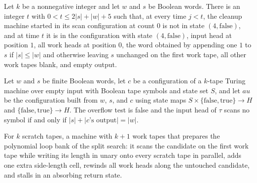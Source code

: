 \begin{lemma}
\label{Turing.FinTM.splitRestore_first}
\leanok
{}
Let $k$ be a nonnegative integer and let $w$ and $s$ be Boolean words. There is an
integer $t$ with $0<t\le 2|s|+|w|+5$ such that, at every time $j<t$, the cleanup machine
started in its scan configuration at count $0$ is not in state $(4,\mathrm{false})$, and
at time $t$ it is in the configuration with state $(4,\mathrm{false})$, input head at
position $1$, all work heads at position $0$, the word obtained by appending one $1$ to
$s$ if $|s|\le |w|$ and otherwise leaving $s$ unchanged on the first work tape, all
other work tapes blank, and empty output.
\end{lemma}

\begin{lemma}
\label{Turing.FinTM.splitCount_accept}
\leanok
{}
Let $w$ and $s$ be finite Boolean words, let $c$ be a configuration of a $k$-tape Turing
machine over empty input with Boolean tape symbols and state set $S$, and let $	au$ be
the configuration built from $w$, $s$, and $c$ using state maps
$S\times\{\mathrm{false},\mathrm{true}\}\to H$ and $\{\mathrm{false},\mathrm{true}\}\to
H$. The overflow test is false and the input head of $\tau$ scans no symbol if and only
if $|s|+|c\text{'s output}|=|w|$.
\end{lemma}

\begin{definition}
\label{Turing.FinTM.splitPrepareTM}
\leanok
{}
For $k$ scratch tapes, a machine with $k+1$ work tapes that prepares the
polynomial loop bank of the split search: it scans the candidate on the first
work tape while writing its length in unary onto every scratch tape in
parallel, adds one extra side-length cell, rewinds all work heads along the
untouched candidate, and stalls in an absorbing return state.
\end{definition}

